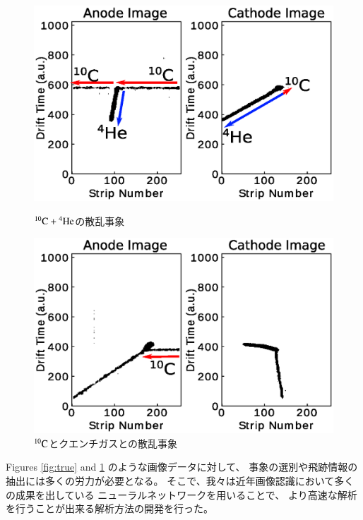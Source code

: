 \documentclass{jps-cp}
\begin{document}
\begin{figure}
  \centering
  \begin{minipage}{0.4\columnwidth}
    \centering
    \includegraphics[clip, width=0.9\columnwidth]{eps/true.eps}
    \caption{${}^{10}\rm{C}+{}^{4}\rm{He}$の散乱事象}
    \label{fig:true}
  \end{minipage}
  \begin{minipage}{0.4\columnwidth}
    \centering
    \includegraphics[clip, width=0.9\columnwidth]{eps/false.eps}
    \caption{${}^{10}\rm{C}$とクエンチガスとの散乱事象}
    \label{fig:false}
  \end{minipage}
\end{figure}

Figures \ref{fig:true} and \ref{fig:false} のような画像データに対して、
事象の選別や飛跡情報の抽出には多くの労力が必要となる。
そこで、我々は近年画像認識において多くの成果を出している
ニューラルネットワークを用いることで、
より高速な解析を行うことが出来る解析方法の開発を行った。
\end{document}
